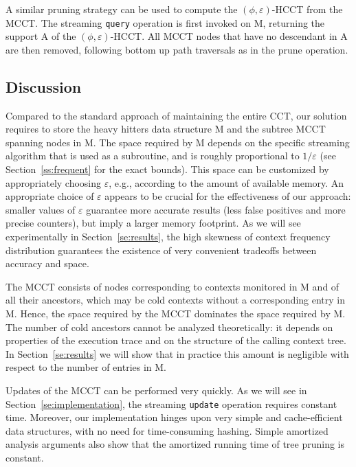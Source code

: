 \documentclass[preprint]{sigplanconf}
\begin{document}
A similar pruning strategy can be used to compute the $(\phi,\varepsilon)$-HCCT from the MCCT. The streaming {\tt query} operation is first invoked on M, returning the support A of the $(\phi,\varepsilon)$-HCCT. All MCCT nodes that have no descendant in A are then removed, following bottom up path traversals as in the prune operation.

\subsection{Discussion}
\label{ss:discussion}

Compared to the standard approach of maintaining the entire CCT, our solution requires to store the heavy hitters data structure M and the subtree MCCT spanning nodes in M. The space required by M depends on the specific streaming algorithm that is used as a subroutine, and is roughly proportional to $1/\varepsilon$ (see Section~\ref{ss:frequent} for the exact bounds). This space can be customized by appropriately choosing $\varepsilon$, e.g., according to the amount of available memory. An appropriate choice of $\varepsilon$ appears to be crucial for the effectiveness of our approach: smaller values of $\varepsilon$ guarantee more accurate results (less false positives and more precise counters), but imply a larger memory footprint. As we will see experimentally in Section~\ref{se:results}, the high skewness of context frequency distribution guarantees the existence of very convenient tradeoffs between accuracy and space.

The MCCT consists of nodes corresponding to contexts monitored in M and of all their ancestors, which may be cold contexts without a corresponding entry in M. Hence, the space required by the MCCT  dominates the space required by M. The number of cold ancestors cannot be analyzed theoretically: it depends on properties of the execution trace and on the structure of the calling context tree. In Section~\ref{se:results} we will show that in practice this amount is negligible with respect to the number of entries in M.

Updates of the MCCT can be performed very quickly. As we will see in Section~\ref{se:implementation}, the streaming {\tt update} operation requires constant time. Moreover, our implementation hinges upon very simple and cache-efficient data structures, with no need for time-consuming hashing. Simple amortized analysis arguments also show that the amortized running time of tree pruning is constant. 
\end{document}
